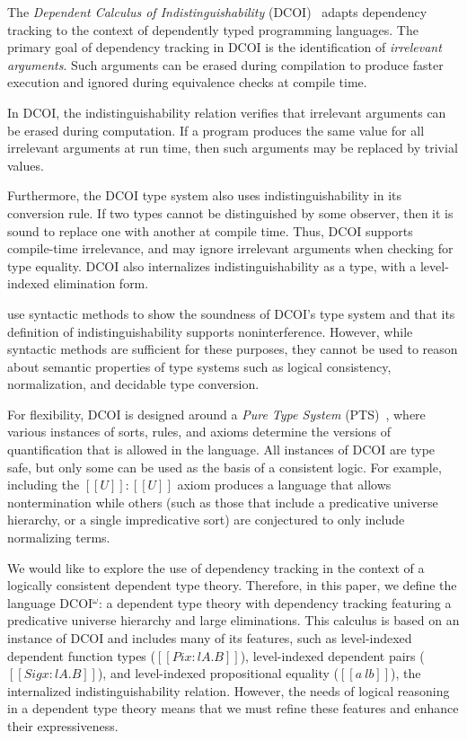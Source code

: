 \documentclass[acmsmall, screen=true, nonacm=true,
  review=\ifpublic false\else true\fi,
  anonymous=\ifanonymous true\else false\fi
]{acmart}
\makeatletter
\newcommand{\dcoi}{DCOI\@\xspace}
\newcommand{\name}{\texorpdfstring{DCOI$^{\omega}$\@\xspace}{DCOI-omega}}
\newcommand{\longname}{Dependent Calculus of Indistinguishability\@\xspace}
\makeatother
\begin{document}
The \emph{\longname} (\dcoi)~\cite{liu:dcoi} adapts dependency tracking to the
context of dependently typed programming languages. The primary goal of
dependency tracking in \dcoi is the identification of \emph{irrelevant
  arguments}.  Such arguments can be erased during compilation to produce
faster execution and ignored during equivalence checks at compile time.

In \dcoi, the indistinguishability relation verifies that irrelevant arguments
can be erased during computation. If a program produces the same value for all
irrelevant arguments at run time, then such arguments may
be replaced by trivial values.

Furthermore, the \dcoi type system also uses indistinguishability in its
conversion rule. If two types cannot be distinguished by some observer, then
it is sound to replace one with another at compile time. Thus, \dcoi supports
compile-time irrelevance, and may ignore irrelevant arguments when checking
for type equality. \dcoi also internalizes indistinguishability as a type, 
with a level-indexed elimination form.

\citet{liu:dcoi} use syntactic methods to show the soundness of \dcoi's type
system and that its definition of indistinguishability supports
noninterference. However, while syntactic methods are sufficient for these
purposes, they cannot be used to reason about semantic properties of type
systems such as logical consistency, normalization, and decidable
type conversion.

For flexibility, \dcoi is designed around a \emph{Pure Type System}
(PTS)~\citep{barendregt:PTS},
where various instances of sorts, rules, and axioms determine the versions of
quantification that is allowed in the language. All instances of \dcoi are
type safe, but only some can be used as the basis of a consistent logic. For
example, including the $[[U]] : [[U]]$ axiom produces a language that allows
nontermination while others (such as those that include a predicative universe
hierarchy, or a single impredicative sort) are conjectured to only
include normalizing terms.

We would like to explore the use of dependency tracking in the context of a
logically consistent dependent type theory.  Therefore, in this paper, we
define the language \name: a dependent type theory with dependency tracking
featuring a predicative universe hierarchy and large eliminations.  This
calculus is based on an instance of \dcoi and includes many of its features,
such as level-indexed dependent function types ($[[Pi x : l A . B]]$),
level-indexed dependent pairs ($[[Sig x : l A. B]]$), and level-indexed
propositional equality ($[[a ~l b]]$), the internalized indistinguishability
relation. However, the needs of logical reasoning in a dependent type theory
means that we must refine these features and enhance their expressiveness.
\end{document}
